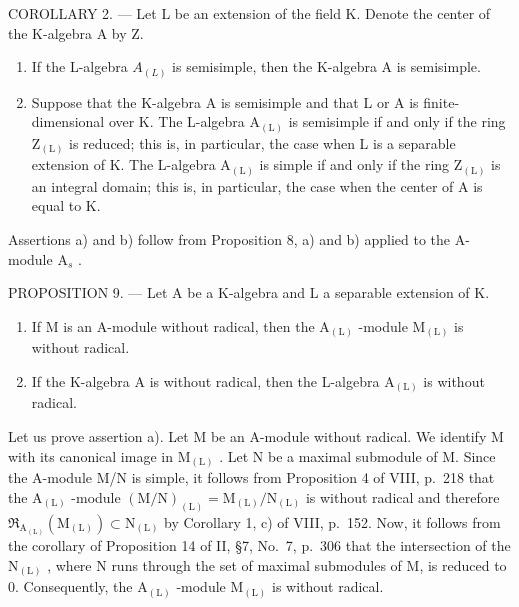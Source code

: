 COROLLARY 2. --- Let L be an extension of the field K. Denote the center of the K-algebra A by Z.

\begin{enumerate}
\def\labelenumi{\alph{enumi})}
\item
  If the L-algebra \(A_{(L)}\) is semisimple, then the K-algebra A is semisimple.
\item
  Suppose that the K-algebra A is semisimple and that L or A is finite-dimensional over K. The L-algebra \(\mathrm{A}_{(\mathrm{L})}\) is semisimple if and only if the ring \(\mathrm{Z}_{(\mathrm{L})}\) is reduced; this is, in particular, the case when L is a separable extension of K. The L-algebra \(\mathrm{A}_{(\mathrm{L})}\) is simple if and only if the ring \(\mathrm{Z}_{(\mathrm{L})}\) is an integral domain; this is, in particular, the case when the center of A is equal to K.
\end{enumerate}

Assertions a) and b) follow from Proposition 8, a) and b) applied to the A-module \(\mathrm{A}_s\) .

PROPOSITION 9. --- Let A be a K-algebra and L a separable extension of K.

\begin{enumerate}
\def\labelenumi{\alph{enumi})}
\item
  If M is an A-module without radical, then the \(\mathrm{A}_{(\mathrm{L})}\) -module \(\mathrm{M}_{(\mathrm{L})}\) is without radical.
\item
  If the K-algebra A is without radical, then the L-algebra \(\mathrm{A}_{(\mathrm{L})}\) is without radical.
\end{enumerate}

Let us prove assertion a). Let M be an A-module without radical. We identify M with its canonical image in \(\mathrm{M}_{(\mathrm{L})}\) . Let N be a maximal submodule of M. Since the A-module M/N is simple, it follows from Proposition 4 of VIII, p.~218 that the \(\mathrm{A}_{(\mathrm{L})}\) -module \((\mathrm{M}/\mathrm{N})_{(\mathrm{L})} = \mathrm{M}_{(\mathrm{L})}/\mathrm{N}_{(\mathrm{L})}\) is without radical and therefore \(\mathfrak{R}_{\mathrm{A}_{(\mathrm{L})}}(\mathrm{M}_{(\mathrm{L})}) \subset \mathrm{N}_{(\mathrm{L})}\) by Corollary 1, c) of VIII, p.~152. Now, it follows from the corollary of Proposition 14 of II, §7, No.~7, p.~306 that the intersection of the \(\mathrm{N}_{(\mathrm{L})}\) , where N runs through the set of maximal submodules of M, is reduced to 0. Consequently, the \(\mathrm{A}_{(\mathrm{L})}\) -module \(\mathrm{M}_{(\mathrm{L})}\) is without radical.

